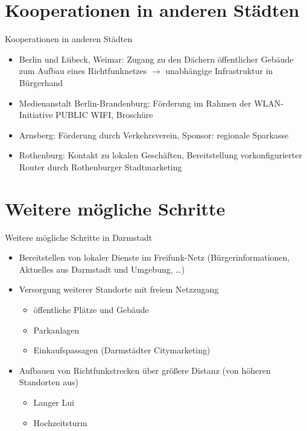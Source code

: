 \documentclass[]{beamer}
\begin{document}
\section{Kooperationen in anderen Städten}
\begin{frame}{Kooperationen in anderen Städten}
\begin{itemize}
\item Berlin und Lübeck, Weimar: Zugang zu den Dächern öffentlicher Gebäude zum Aufbau eines Richtfunknetzes \newline $\rightarrow$ unabhängige Infrastruktur in Bürgerhand \pause
\item Medienanstalt Berlin-Brandenburg: Förderung im Rahmen der WLAN-Initiative PUBLIC WIFI, Broschüre \pause
\item Arnsberg: Förderung durch Verkehrsverein, Sponsor: regionale Sparkasse \pause
\item Rothenburg: Kontakt zu lokalen Geschäften, Bereitstellung vorkonfigurierter Router durch Rothenburger Stadtmarketing \pause
\end{itemize}
\end{frame}


\section{Weitere mögliche Schritte}
\begin{frame}{Weitere mögliche Schritte in Darmstadt}
\begin{itemize}
\item Bereitstellen von lokaler Dienste im Freifunk-Netz (Bürgerinformationen, Aktuelles aus Darmstadt und Umgebung, \ldots) \pause
\item Versorgung weiterer Standorte mit freiem Netzzugang \pause
\begin{itemize}
	\item öffentliche Plätze und Gebäude \pause
	\item Parkanlagen \pause
	\item Einkaufspassagen (Darmstädter Citymarketing) \pause
\end{itemize}
\item Aufbauen von Richtfunkstrecken über größere Distanz (von höheren Standorten aus) \pause
\begin{itemize}
	\item Langer Lui
	\item Hochzeitsturm
\end{itemize}
\end{itemize}
\vfill
\end{frame}
\end{document}
